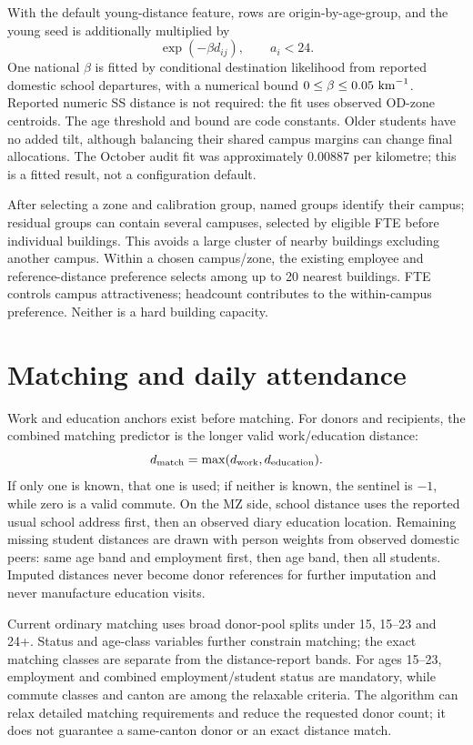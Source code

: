 \documentclass[11pt,a4paper]{article}
\begin{document}
With the default young-distance feature, rows are origin-by-age-group, and
the young seed is additionally multiplied by
\[
 \exp(-\beta d_{ij}),\qquad a_i<24.
\]
One national \(\beta\) is fitted by conditional destination likelihood from
reported domestic school departures, with a numerical bound
\(0\leq\beta\leq0.05\ {\rm km}^{-1}\). Reported numeric SS distance is not
required: the fit uses observed OD-zone centroids. The age threshold and bound
are code constants. Older students have no added tilt, although balancing
their shared campus margins can change final allocations. The October audit
fit was approximately 0.00887 per kilometre; this is a fitted result, not a
configuration default.

After selecting a zone and calibration group, named groups identify their
campus; residual groups can contain several campuses, selected by eligible
FTE before individual buildings. This avoids a large cluster of nearby
buildings excluding another campus. Within a chosen campus/zone, the existing
employee and reference-distance preference selects among up to 20 nearest
buildings. FTE controls campus attractiveness; headcount contributes to the
within-campus preference. Neither is a hard building capacity.

\section{Matching and daily attendance}

Work and education anchors exist before matching. For donors and recipients,
the combined matching predictor is the longer valid work/education distance:
\[
 d_{\rm match}=\max(d_{\rm work},d_{\rm education}).
\]
If only one is known, that one is used; if neither is known, the sentinel is
\(-1\), while zero is a valid commute. On the MZ side, school distance uses
the reported usual school address first, then an observed diary education
location. Remaining missing student distances are drawn with person weights
from observed domestic peers: same age band and employment first, then age
band, then all students. Imputed distances never become donor references for
further imputation and never manufacture education visits.

Current ordinary matching uses broad donor-pool splits under 15, 15--23 and
24+. Status and age-class variables further constrain matching; the exact
matching classes are separate from the distance-report bands. For ages 15--23,
employment and combined employment/student status are mandatory, while
commute classes and canton are among the relaxable criteria. The algorithm
can relax detailed matching requirements and reduce the requested donor count;
it does not guarantee a same-canton donor or an exact distance match.
\end{document}
